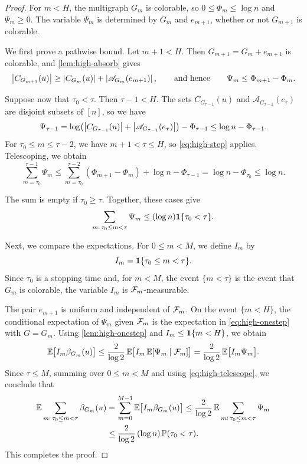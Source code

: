 \begin{proof}
For $m < H$, the multigraph $G_m$ is colorable, so $0 \le \Phi_m \le \log n$ and $\Psi_m \ge 0$. The variable $\Psi_m$ is determined by $G_m$ and $e_{m + 1}$, whether or not $G_{m + 1}$ is colorable.

We first prove a pathwise bound. Let $m + 1 < H$. Then $G_{m + 1} = G_m + e_{m + 1}$ is colorable, and \cref{lem:high-absorb} gives
\begin{equation}\label{eq:high-step}
\left|C_{G_{m + 1}}(u)\right| \ge \left|C_{G_m}(u)\right| + \left|\mathscr{A}_{G_m}(e_{m + 1})\right|, \qquad \text{and hence} \qquad \Psi_m \le \Phi_{m + 1} - \Phi_m.
\end{equation}

Suppose now that $\tau_0 < \tau$. Then $\tau - 1 < H$. The sets $C_{G_{\tau - 1}}(u)$ and $\mathscr{A}_{G_{\tau - 1}}(e_\tau)$ are disjoint subsets of $[n]$, so we have
\[
\Psi_{\tau - 1} = \log \bigl( \left|C_{G_{\tau - 1}}(u)\right| + \left|\mathscr{A}_{G_{\tau - 1}}(e_\tau)\right| \bigr) - \Phi_{\tau - 1} \le \log n - \Phi_{\tau - 1}.
\]
For $\tau_0 \le m \le \tau - 2$, we have $m + 1 < \tau \le H$, so \eqref{eq:high-step} applies. Telescoping, we obtain
\[
\sum_{m = \tau_0}^{\tau - 1} \Psi_m \le \sum_{m = \tau_0}^{\tau - 2} (\Phi_{m + 1} - \Phi_m) + \log n - \Phi_{\tau - 1} = \log n - \Phi_{\tau_0} \le \log n.
\]

The sum is empty if $\tau_0 \ge \tau$. Together, these cases give
\begin{equation}\label{eq:high-telescope}
\sum_{m : \, \tau_0 \le m < \tau} \Psi_m \le (\log n) \mathbf 1 \{ \tau_0 < \tau \}.
\end{equation}

Next, we compare the expectations. For $0 \le m < M$, we define $I_m$ by
\[
I_m = \mathbf 1 \{ \tau_0 \le m < \tau \}.
\]
Since $\tau_0$ is a stopping time and, for $m < M$, the event $\{ m < \tau \}$ is the event that $G_m$ is colorable, the variable $I_m$ is $\mathcal F_m$-measurable.

The pair $e_{m + 1}$ is uniform and independent of $\mathcal F_m$. On the event $\{ m < H \}$, the conditional expectation of $\Psi_m$ given $\mathcal F_m$ is the expectation in \eqref{eq:high-onestep} with $G = G_m$. Using \cref{lem:high-onestep} and $I_m \le \mathbf 1 \{ m < H \}$, we obtain
\[
\mathbb E \bigl[ I_m \beta_{G_m}(u) \bigr] \le \frac{2}{\log 2} \, \mathbb E \bigl[ I_m \, \mathbb E [ \Psi_m \mid \mathcal F_m ] \bigr] = \frac{2}{\log 2} \, \mathbb E \bigl[ I_m \Psi_m \bigr].
\]
Since $\tau \le M$, summing over $0 \le m < M$ and using \eqref{eq:high-telescope}, we conclude that
\[
\begin{split}
\mathbb E \sum_{m : \, \tau_0 \le m < \tau} \beta_{G_m}(u) &= \sum_{m = 0}^{M - 1} \mathbb E \bigl[ I_m \beta_{G_m}(u) \bigr] \le \frac{2}{\log 2} \, \mathbb E \sum_{m : \, \tau_0 \le m < \tau} \Psi_m\\
&\le \frac{2}{\log 2} \, (\log n) \, \mathbb P(\tau_0 < \tau).
\end{split}
\]
This completes the proof.
\end{proof}

